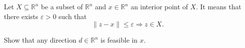 
Let $X \subseteq \mathbb{R}^n$ be a subset of $\mathbb{R}^n$ and $x
\in \mathbb{R}^n$ an interior point of $X$. It means that  there exists
$\varepsilon > 0$ such that
\[
\|z-x\| \leq \varepsilon \Longrightarrow z \in X.
\]

Show that any direction $d \in \mathbb{R}^n$ is feasible in $x$.


